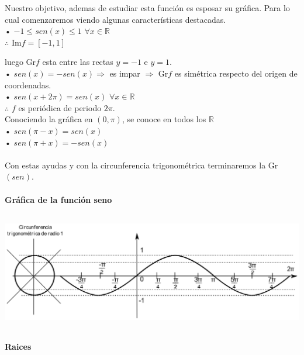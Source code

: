 Nuestro objetivo, ademas de estudiar esta función es esposar su gráfica. Para lo cual comenzaremos viendo algunas características destacadas.\\

• $-1 \leq sen(x) \leq 1$ $\forall x \in \mathbb{R}$\\

\qquad $\therefore $ Im$f = [-1,1]$

\qquad luego Gr$f$ esta entre las rectas $y=-1$ e $y=1$.\\

• $sen(x) = -sen(x) \Rightarrow $ es impar $\Rightarrow$ Gr$f$ es simétrica respecto del origen de coordenadas.\\

• $sen(x+2 \pi) = sen(x)$ $ \forall x \in \mathbb{R}$\\

\qquad $\therefore$ $f$ es periódica de periodo $2\pi$.\\

\qquad Conociendo la gráfica en $(0, \pi)$, se conoce en todos los $\mathbb{R}$\\

• $sen(\pi -x) = sen(x)$\\

• $sen(\pi +x) = -sen(x)$\\
\\
Con estas ayudas y con la circunferencia trigonométrica terminaremos la Gr$(sen)$.
\paragraph{Gráfica de la función seno}
\begin{center}
\includegraphics[height=5cm,width=15cm]{sen.eps} 
\end{center}

\paragraph{Raices}
\qquad\\

